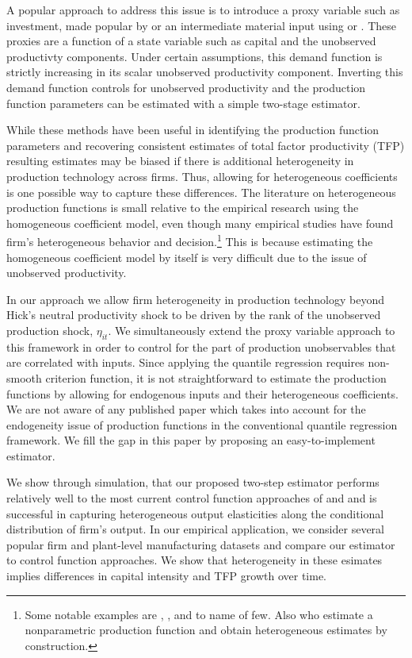 \documentclass[11pt]{article}
\begin{document}
A popular approach to address this issue is to introduce a proxy variable such as investment, made popular by \cite{Olley1996} or an intermediate material input using \cite{Levinsohn2003} or \cite{Ackerberg2015}. These proxies are a function of a state variable such as capital and the unobserved productivty components. Under certain assumptions, this demand function is strictly increasing in its scalar unobserved productivity component. Inverting this demand function controls for unobserved productivity and the production function parameters can be estimated with a simple two-stage estimator.

While these methods have been useful in identifying the production function parameters and recovering consistent estimates of total factor productivity (TFP) resulting estimates may be biased if there is additional heterogeneity in production technology across firms. Thus, allowing for heterogeneous coefficients is one possible way to capture these differences. The literature on heterogeneous production functions is small relative to the empirical research using the homogeneous coefficient model, even though many empirical studies have found firm's heterogeneous behavior and decision.\footnote{Some notable examples are \cite*{Kasahara2015}, \cite*{balat}, \cite*{Li2017} and \cite*{mert} to name of few. Also \cite{Gandhi2020} who estimate a nonparametric production function and obtain heterogeneous estimates by construction.} This is because estimating the homogeneous coefficient model by itself is very difficult due to the issue of unobserved productivity. 

In our approach we allow firm heterogeneity in production technology beyond Hick's neutral productivity shock to be driven by the rank of the unobserved production shock, $\eta_{it}$.  We simultaneously extend the proxy variable approach to this framework in order to control for the part of production unobservables that are correlated with inputs. Since applying the quantile regression requires non-smooth criterion function, it is not straightforward to estimate the production functions by allowing for endogenous inputs and their heterogeneous coefficients. We are not aware of any published paper which takes into account for the endogeneity issue of production functions in the conventional quantile regression framework. We fill the gap in this paper by proposing an easy-to-implement estimator.

We show through simulation, that our proposed two-step estimator performs relatively well to the most current control function approaches of \cite{Levinsohn2003} and \cite{Ackerberg2015} and is successful in capturing heterogeneous output elasticities along the conditional distribution of firm's output. In our empirical application, we consider several popular firm and plant-level manufacturing datasets and compare our estimator to control function approaches. We show that heterogeneity in these esimates implies differences in capital intensity and TFP growth over time. 
\end{document}
